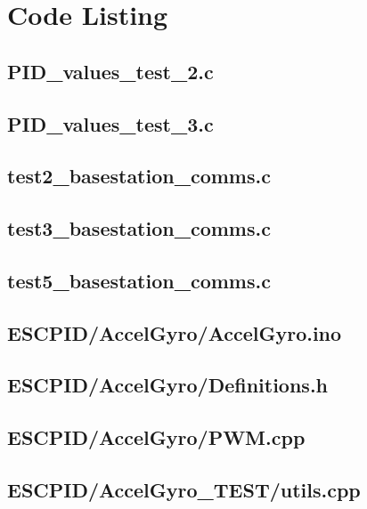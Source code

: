 \documentclass[a4paper,11pt]{article}
\begin{document}
\appendix
\section{Code Listing}
\subsection{PID\_values\_test\_2.c}
 
\subsection{PID\_values\_test\_3.c}
 
\subsection{test2\_basestation\_comms.c}
 
 \subsection{test3\_basestation\_comms.c}
 
 \subsection{test5\_basestation\_comms.c}
 
\subsection{ESCPID/AccelGyro/AccelGyro.ino}

\subsection{ESCPID/AccelGyro/Definitions.h}

\subsection{ESCPID/AccelGyro/PWM.cpp}

\subsection{ESCPID/AccelGyro\_TEST/utils.cpp}

\end{document}
